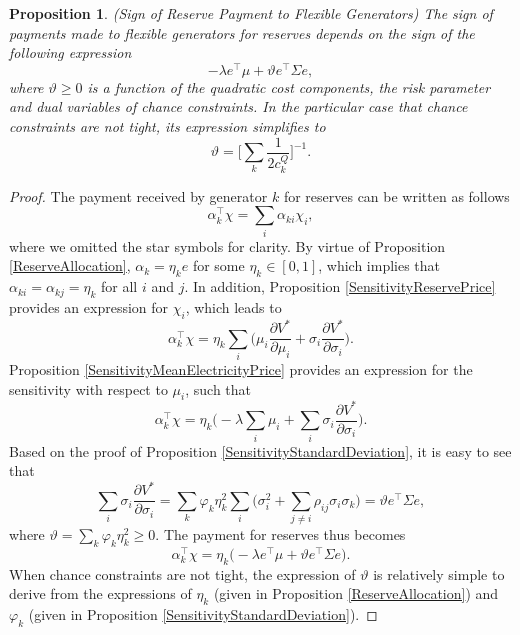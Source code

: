 \documentclass{article}
\newtheorem{proposition}{Proposition}
\begin{document}
\begin{proposition}\label{SignReservePayment}
(Sign of Reserve Payment to Flexible Generators) The sign of payments made to flexible generators for reserves depends on the sign of the following expression
\begin{equation*}
-\lambda e^\top \mu + \vartheta e^\top \Sigma e,
\end{equation*}
where $\vartheta \ge 0$ is a function of the quadratic cost components, the risk parameter and dual variables of chance constraints. In the particular case that chance constraints are not tight, its expression simplifies to
\begin{equation*}
\vartheta = \bigg[\sum_k \frac{1}{2 c_k^Q} \bigg]^{-1}.
\end{equation*} 
\end{proposition}
\begin{proof}
The payment received by generator $k$ for reserves can be written as follows
\begin{equation*}
\alpha_k^\top \chi = \sum_i \alpha_{ki} \chi_i,
\end{equation*}
where we omitted the star symbols for clarity. By virtue of Proposition \ref{ReserveAllocation}, $\alpha_k = \eta_k e$ for some $\eta_k \in [0, 1]$, which implies that $\alpha_{ki} = \alpha_{kj} = \eta_k$ for all $i$ and $j$. In addition, Proposition \ref{SensitivityReservePrice} provides an expression for $\chi_i$, which leads to
\begin{equation*}
\alpha_k^\top \chi = \eta_k \sum_i \bigg(\mu_i \frac{\partial V^*}{\partial \mu_i} + \sigma_i \frac{\partial V^*}{\partial \sigma_i}\bigg).
\end{equation*}
Proposition \ref{SensitivityMeanElectricityPrice} provides an expression for the sensitivity with respect to $\mu_i$, such that
\begin{equation*}
\alpha_k^\top \chi = \eta_k \bigg(-\lambda \sum_i \mu_i + \sum_i \sigma_i \frac{\partial V^*}{\partial \sigma_i}\bigg).
\end{equation*}
Based on the proof of Proposition \ref{SensitivityStandardDeviation}, it is easy to see that
\begin{equation*}
\sum_i \sigma_i \frac{\partial V^*}{\partial \sigma_i} = \sum_k \varphi_k \eta_k^2 \sum_i\Big(\sigma_i^2 + \sum_{j \ne i} \rho_{ij} \sigma_i \sigma_k\Big) = \vartheta e^\top \Sigma e,
\end{equation*}
where $\vartheta = \sum_k \varphi_k \eta_k^2 \ge 0$. The payment for reserves thus becomes
\begin{equation*}
\alpha_k^\top \chi = \eta_k \Big(-\lambda e^\top \mu + \vartheta e^\top \Sigma e\Big).
\end{equation*}
When chance constraints are not tight, the expression of $\vartheta$ is relatively simple to derive from the expressions of $\eta_k$ (given in Proposition \ref{ReserveAllocation}) and $\varphi_k$ (given in Proposition \ref{SensitivityStandardDeviation}).
\end{proof}
\end{document}
